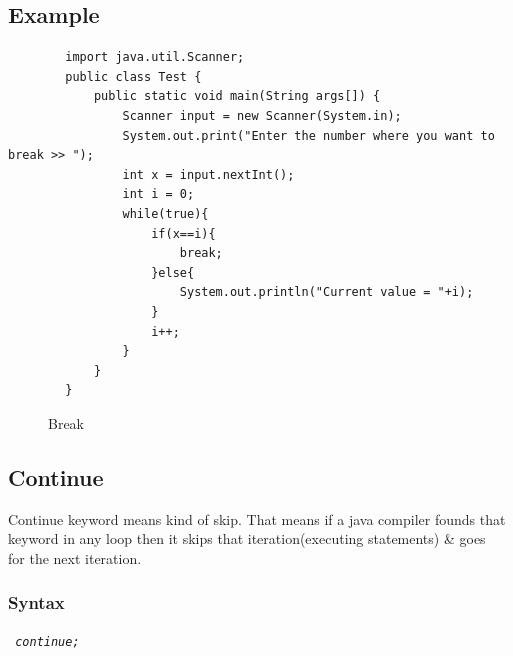 \documentclass[openany]{book}  %
\begin{document}
\subsection{Example}
\begin{center}
    \begin{verbatim}
        import java.util.Scanner;
        public class Test {
            public static void main(String args[]) {
                Scanner input = new Scanner(System.in);
                System.out.print("Enter the number where you want to break >> ");
                int x = input.nextInt();
                int i = 0;
                while(true){
                    if(x==i){
                        break;
                    }else{
                        System.out.println("Current value = "+i);
                    }
                    i++;
                }
            }
        }
    \end{verbatim}
\end{center}
% 
%
\begin{figure}[htbp]
    \begin{center}
        \caption{Break}
    \end{center}
\end{figure}

\newpage

% 
% 
\subsection{Continue}
Continue keyword means kind of skip. That means if a java compiler founds that \\
keyword in any loop then it skips that iteration(executing statements) \& goes \\
for the next iteration.
% 
% 
\subsubsection{Syntax}
\begin{center}
    \tt{
        \textit{continue;}
    }
\end{center}
% 
% 
\end{document}
